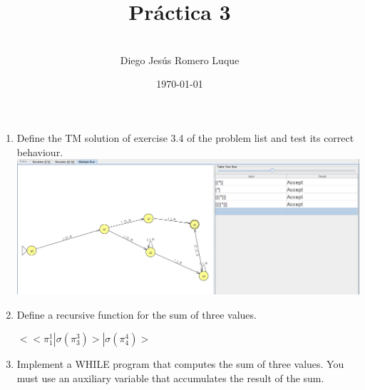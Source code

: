 \documentclass{article}
\title{\textbf{Pr\'actica 3}}
\author{\\Diego Jes\'us Romero Luque}
\date{\today}
\begin{document}
\maketitle
\pagebreak

\begin{enumerate}
  \item Define the TM solution of exercise 3.4 of the problem list and test its correct behaviour.\\
      \includegraphics[scale=0.35]{TM.png}
  \item Define a recursive function for the sum of three values.
    \begin{center}
      $<$$<\pi^1_1|\sigma(\pi^3_3)>|\sigma(\pi^4_4)>$
    \end{center}
    \pagebreak
  \item Implement a WHILE program that computes the sum of three values. You
   must use an auxiliary variable that accumulates the result of the sum.\\
\end{enumerate}
\end{document}
